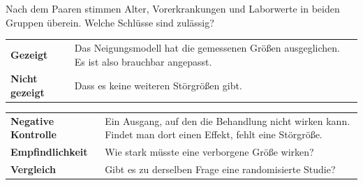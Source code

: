 \begin{aufgabe}
Nach dem Paaren stimmen Alter, Vorerkrankungen und Laborwerte in beiden Gruppen überein. Welche Schlüsse sind zulässig?

\loesung
{}
\begin{center}
{\small
\renewcommand{\arraystretch}{1.5}
\begin{tabular}{@{}P{2.8cm}P{5.8cm}@{}}
\toprule
\textbf{Gezeigt} & Das Neigungsmodell hat die gemessenen Größen ausgeglichen. Es ist also brauchbar angepasst.\\
\textbf{Nicht gezeigt} & Dass es keine weiteren Störgrößen gibt.\\
\bottomrule
\end{tabular}}
\end{center}

\begin{center}
\begin{minipage}{0.88\textwidth}
\end{minipage}
\end{center}

\begin{center}
{\small
\renewcommand{\arraystretch}{1.5}
\begin{tabular}{@{}P{2.8cm}P{5.8cm}@{}}
\toprule
\textbf{Negative Kontrolle} & Ein Ausgang, auf den die Behandlung nicht wirken kann. Findet man dort einen Effekt, fehlt eine Störgröße.\\
\textbf{Empfindlichkeit} & Wie stark müsste eine verborgene Größe wirken?\\
\textbf{Vergleich} & Gibt es zu derselben Frage eine randomisierte Studie?\\
\bottomrule
\end{tabular}}
\end{center}

\begin{center}
\begin{minipage}{0.88\textwidth}
\end{minipage}
\end{center}
\end{aufgabe}

